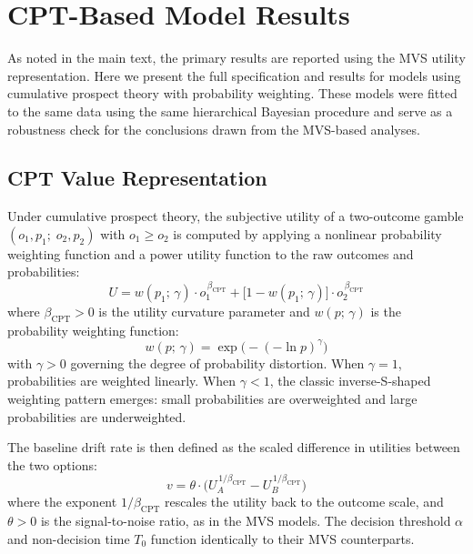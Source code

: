 \documentclass[man,floatsintext]{apa7}
\begin{document}
\clearpage

\section{CPT-Based Model Results}
\label{sec:cpt_results}

As noted in the main text, the primary results are reported using the MVS utility representation. Here we present the full specification and results for models using cumulative prospect theory \parencite[CPT;][]{tversky_advances_1992} with \textcite{prelec_probability_1998} probability weighting. These models were fitted to the same data using the same hierarchical Bayesian procedure and serve as a robustness check for the conclusions drawn from the MVS-based analyses.

\subsection{CPT Value Representation}

Under cumulative prospect theory, the subjective utility of a two-outcome gamble $(o_1, p_1;\; o_2, p_2)$ with $o_1 \geq o_2$ is computed by applying a nonlinear probability weighting function and a power utility function to the raw outcomes and probabilities:
\begin{equation}
    U = w(p_1;\, \gamma) \cdot o_1^{\,\beta_{\text{CPT}}} + \bigl[1 - w(p_1;\, \gamma)\bigr] \cdot o_2^{\,\beta_{\text{CPT}}}
    \label{eq:cpt_utility}
\end{equation}
where $\beta_{\text{CPT}} > 0$ is the utility curvature parameter and $w(p;\, \gamma)$ is the \textcite{prelec_probability_1998} probability weighting function:
\begin{equation}
    w(p;\, \gamma) = \exp\!\bigl(-(-\ln p)^{\gamma}\bigr)
    \label{eq:prelec}
\end{equation}
with $\gamma > 0$ governing the degree of probability distortion. When $\gamma = 1$, probabilities are weighted linearly. When $\gamma < 1$, the classic inverse-S-shaped weighting pattern emerges: small probabilities are overweighted and large probabilities are underweighted.

The baseline drift rate is then defined as the scaled difference in utilities between the two options:
\begin{equation}
    v = \theta \cdot \bigl(U_A^{\,1/\beta_{\text{CPT}}} - U_B^{\,1/\beta_{\text{CPT}}}\bigr)
    \label{eq:cpt_drift}
\end{equation}
where the exponent $1/\beta_{\text{CPT}}$ rescales the utility back to the outcome scale, and $\theta > 0$ is the signal-to-noise ratio, as in the MVS models. The decision threshold $\alpha$ and non-decision time $T_0$ function identically to their MVS counterparts.
\end{document}
